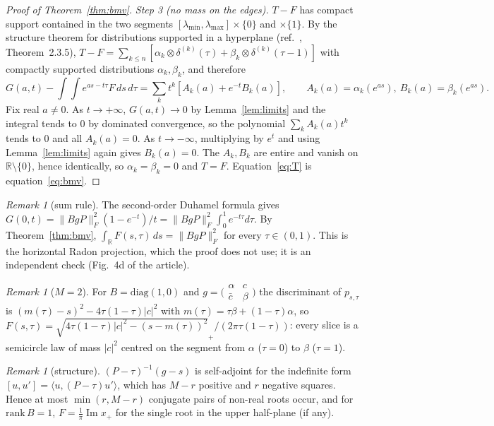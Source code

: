 \documentclass[11pt]{amsart}
\theoremstyle{definition}
\theoremstyle{remark}
\newtheorem{remark}[theorem]{Remark}
\numberwithin{equation}{section}
\newcommand{\R}{\mathbb{R}}
\renewcommand{\Im}{\operatorname{Im}}
\begin{document}
\begin{proof}[Proof of Theorem~\ref{thm:bmv}]
\emph{Step 3 (no mass on the edges).} $T-F$ has compact support contained in the two segments
$[\lambda_{\min},\lambda_{\max}]\times\{0\}$ and $\times\{1\}$. By the structure theorem for distributions supported in
a hyperplane (ref.~\cite{Hormander}, Theorem~2.3.5), $T-F=\sum_{k\le n}[\alpha_k\otimes\delta^{(k)}(\tau)+\beta_k\otimes
\delta^{(k)}(\tau-1)]$ with compactly supported distributions $\alpha_k,\beta_k$, and therefore
\[
G(a,t)-\int\!\!\int e^{as-t\tau}F\,ds\,d\tau=\sum_kt^k[A_k(a)+e^{-t}B_k(a)],\qquad A_k(a)=\alpha_k(e^{as}),\ B_k(a)=\beta_k(e^{as}).
\]
Fix real $a\ne0$. As $t\to+\infty$, $G(a,t)\to0$ by Lemma~\ref{lem:limits} and the integral tends to $0$ by dominated
convergence, so the polynomial $\sum_kA_k(a)t^k$ tends to $0$ and all $A_k(a)=0$. As $t\to-\infty$, multiplying by
$e^t$ and using Lemma~\ref{lem:limits} again gives $B_k(a)=0$. The $A_k,B_k$ are entire and vanish on
$\R\setminus\{0\}$, hence identically, so $\alpha_k=\beta_k=0$ and $T=F$. Equation~\eqref{eq:T} is
equation~\eqref{eq:bmv}.
\end{proof}

\begin{remark}[sum rule]\label{rem:sumrule}
The second-order Duhamel formula gives $G(0,t)=\|BgP\|_F^2(1-e^{-t})/t=\|BgP\|_F^2\int_0^1e^{-t\tau}d\tau$. By
Theorem~\ref{thm:bmv}, $\int_\R F(s,\tau)\,ds=\|BgP\|_F^2$ for every $\tau\in(0,1)$. This is the horizontal Radon
projection, which the proof does not use; it is an independent check (Fig.~4d of the article).
\end{remark}

\begin{remark}[$M=2$]\label{rem:m2}
For $B=\mathrm{diag}(1,0)$ and $g=\bigl(\begin{smallmatrix}\alpha&c\\ \bar c&\beta\end{smallmatrix}\bigr)$ the
discriminant of $p_{s,\tau}$ is $(m(\tau)-s)^2-4\tau(1-\tau)|c|^2$ with $m(\tau)=\tau\beta+(1-\tau)\alpha$, so
$F(s,\tau)=\sqrt{4\tau(1-\tau)|c|^2-(s-m(\tau))^2}_+/(2\pi\tau(1-\tau))$: every slice is a semicircle law of mass
$|c|^2$ centred on the segment from $\alpha$ ($\tau=0$) to $\beta$ ($\tau=1$).
\end{remark}

\begin{remark}[structure]
$(P-\tau)^{-1}(g-s)$ is self-adjoint for the indefinite form $[u,u']=\langle u,(P-\tau)u'\rangle$, which has $M-r$
positive and $r$ negative squares. Hence at most $\min(r,M-r)$ conjugate pairs of non-real roots occur, and for
$\mathrm{rank}\,B=1$, $F=\frac1\pi\Im x_+$ for the single root in the upper half-plane (if any).
\end{remark}
\end{document}
